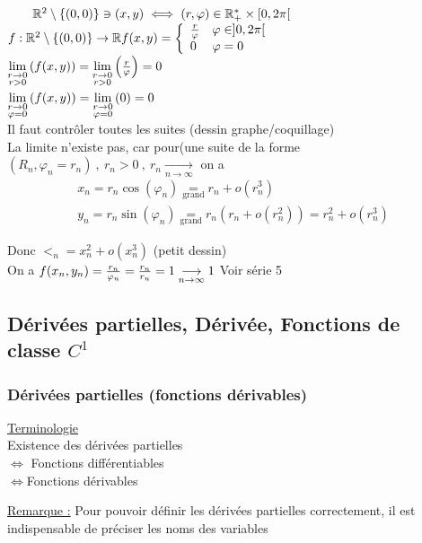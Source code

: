 \documentclass[12pt,a4paper]{article}
\begin{document}
 $\qquad \mathbb{R}^2\setminus\{(0,0)\} \ni (x,y) \iff (r,\varphi) \in \mathbb{R}^*_+ \times [0,2\pi[$\\
$f : \mathbb{R}^2 \setminus \{(0,0)\} \to \mathbb{R}\\
f(x,y) = \left\{\begin{array}{ll}
\frac{r}{\varphi} & \varphi \in ]0,2\pi[\\
0 & \varphi = 0
\end{array}\right.$\\
$\lim\limits_{\substack{r\to 0 \\ r>0}}\left(f(x,y)\right) = \lim\limits_{\substack{r\to 0 \\ r>0}}\left(\frac{r}{\varphi}\right) = 0$\\
$\lim\limits_{\substack{r\to 0 \\ \varphi = 0}}\left(f(x,y)\right) = \lim\limits_{\substack{r\to 0 \\ \varphi = 0}}\left(0\right) = 0$\\
Il faut contrôler toutes les suites (dessin graphe/coquillage)\\
La limite n'existe pas, car pour(une suite de la forme $(R_n, \varphi_n = r_n) \ , \ r_n > 0 \ , \ r_n \underset{n\to\infty}{\longrightarrow}$ on a
\begin{align*}
	x_n = r_n \cos(\varphi_n) \underset{\text{grand}}{=} r_n + o(r_n^3)\\
	y_n = r_n \sin(\varphi_n) \underset{\text{grand}}{=} r_n(r_n+o(r_n^2)) = r_n^2 + o(r_n^3)
\end{align*}

Donc $<_n = x_n^2 + o(x_n^3)$ (petit dessin)\\
On a $f(x_n,y_n) = \frac{r_n}{\varphi_n} = \frac{r_n}{r_n} = 1 \underset{n \to \infty}{\longrightarrow} 1$
Voir série 5

\subsection{Dérivées partielles, Dérivée, Fonctions de classe $C^1$}
\subsubsection{Dérivées partielles (fonctions dérivables)}
\begin{boite}
	\underline{Terminologie}\\
	Existence des dérivées partielles\\
	$\iff$ Fonctions différentiables\\
	$\iff$Fonctions dérivables
\end{boite}

\begin{boite}
	 \underline{Remarque :} Pour pouvoir définir les dérivées partielles correctement, il est indispensable de préciser les noms des variables
\end{boite}
\end{document}
